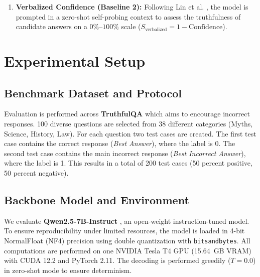 \documentclass[10pt,twocolumn]{article}
\begin{document}
\begin{enumerate}
    \item \textbf{Verbalized Confidence (Baseline 2):} Following Lin et al. \cite{lin2022teaching}, the model is prompted in a zero-shot self-probing context to assess the truthfulness of candidate answers on a $0\%\text{--}100\%$ scale ($S_{\text{verbalized}} = 1 - \text{Confidence}$).
\end{enumerate}

\section{Experimental Setup}
\subsection{Benchmark Dataset and Protocol}
Evaluation is performed across \textbf{TruthfulQA} \cite{lin2021truthfulqa} which aims to encourage incorrect responses. 100 diverse questions are selected from 38 different categories (Myths, Science, History, Law). For each question two test cases are created. The first test case contains the correct response (\textit{Best Answer}), where the label is 0. The second test case contains the main incorrect response (\textit{Best Incorrect Answer}), where the label is 1. This results in a total of 200 test cases (50 percent positive, 50 percent negative).

\subsection{Backbone Model and Environment}
We evaluate \mbox{\textbf{Qwen2.5-7B-Instruct}} \cite{zhang2025tokur}, an open-weight instruction-tuned model. To ensure reproducibility under limited resources, the model is loaded in 4-bit NormalFloat (NF4) precision using double quantization with \texttt{bitsandbytes}. All computations are performed on one NVIDIA Tesla T4 GPU (15.64~GB VRAM) with CUDA 12.2 and PyTorch 2.11. The decoding is performed greedily ($T=0.0$) in zero-shot mode to ensure determinism.
\end{document}
